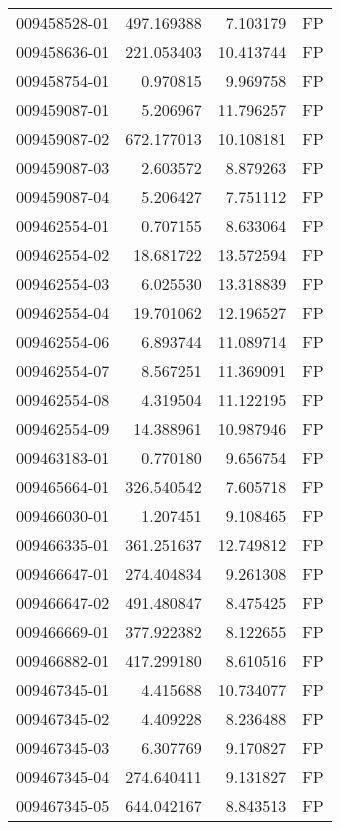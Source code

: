 \begin{tabular}{lrrl}
009458528-01 &  497.169388 &       7.103179 &   FP \\
009458636-01 &  221.053403 &      10.413744 &   FP \\
009458754-01 &    0.970815 &       9.969758 &   FP \\
009459087-01 &    5.206967 &      11.796257 &   FP \\
009459087-02 &  672.177013 &      10.108181 &   FP \\
009459087-03 &    2.603572 &       8.879263 &   FP \\
009459087-04 &    5.206427 &       7.751112 &   FP \\
009462554-01 &    0.707155 &       8.633064 &   FP \\
009462554-02 &   18.681722 &      13.572594 &   FP \\
009462554-03 &    6.025530 &      13.318839 &   FP \\
009462554-04 &   19.701062 &      12.196527 &   FP \\
009462554-06 &    6.893744 &      11.089714 &   FP \\
009462554-07 &    8.567251 &      11.369091 &   FP \\
009462554-08 &    4.319504 &      11.122195 &   FP \\
009462554-09 &   14.388961 &      10.987946 &   FP \\
009463183-01 &    0.770180 &       9.656754 &   FP \\
009465664-01 &  326.540542 &       7.605718 &   FP \\
009466030-01 &    1.207451 &       9.108465 &   FP \\
009466335-01 &  361.251637 &      12.749812 &   FP \\
009466647-01 &  274.404834 &       9.261308 &   FP \\
009466647-02 &  491.480847 &       8.475425 &   FP \\
009466669-01 &  377.922382 &       8.122655 &   FP \\
009466882-01 &  417.299180 &       8.610516 &   FP \\
009467345-01 &    4.415688 &      10.734077 &   FP \\
009467345-02 &    4.409228 &       8.236488 &   FP \\
009467345-03 &    6.307769 &       9.170827 &   FP \\
009467345-04 &  274.640411 &       9.131827 &   FP \\
009467345-05 &  644.042167 &       8.843513 &   FP \\

\end{tabular}

